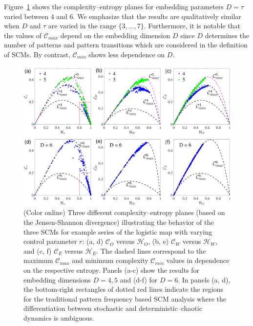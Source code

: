 \documentclass[12pt,aip,cha,reprint,nofootinbib]{revtex4-1}
\begin{document}
Figure~\ref{fig:CElogistic} shows the complexity--entropy planes for embedding parameters $D = \tau$ varied between $4$ and $6$. We emphasize that the results are qualitatively similar when $D$ and $\tau$ are varied in the range $\{3,\ldots, 7\}$. Furthermore, it is notable that the values of $\mathcal{C}_{max}$ depend on the embedding dimension $D$ since $D$ determines the number of patterns and pattern transitions which are considered in the definition of SCMs. By contrast, $\mathcal{C}_{min}$ shows less dependence on $D$. 

\begin{figure}
	\centering 
	\includegraphics[width=2\columnwidth]{CompEntropy_LogisticHC.pdf}
\caption{\small{(Color online) Three different complexity--entropy planes (based on the Jensen-Shannon divergence) illustrating the behavior of the three SCMs for example series of the logistic map with varying control parameter $r$: (a, d) $\mathcal{C}_O$ versus $\mathcal{H}_O$, (b, e) $\mathcal{C}_{W}$ versus $\mathcal{H}_{W}$, and (c, f) $\mathcal{C}_{E}$ versus $\mathcal{H}_{E}$. The dashed lines correspond to the maximum $\mathcal{C}_{max}$ and minimum complexity $\mathcal{C}_{min}$ values in dependence on the respective entropy. Panels (a-c) show the results for embedding dimensions $D = 4,5$ and (d-f) for $D = 6$. In panels (a, d), the bottom-right rectangles of dotted red lines indicate the regions for the traditional pattern frequency based SCM analysis where the differentiation between stochastic and deterministic--chaotic dynamics is ambiguous. }  \label{fig:CElogistic}}
\end{figure}
\end{document}
